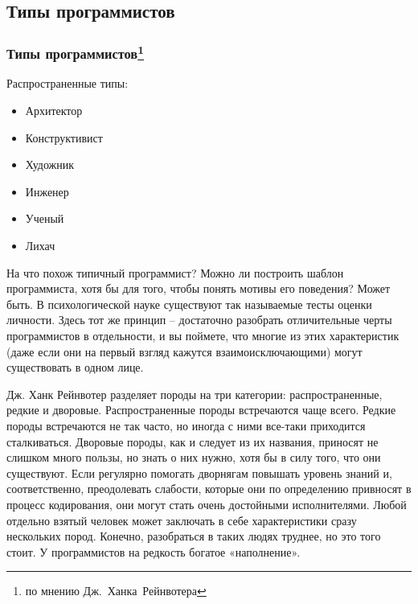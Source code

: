 \documentclass{../industrial-development}
\begin{document}
{\subsection{Типы программистов}
\begin{frame} \frametitle{Типы программистов\footnote[1]{по мнению Дж.~Ханка~Рейнвотера}}
	\begin{block}{Распространенные типы:}
\begin{itemize}
\item Архитектор
\item Конструктивист 
\item Художник
\item Инженер
\item Ученый
\item Лихач
\end{itemize}
\end{block}
\end{frame}
\lecturenotes
На что похож типичный программист? Можно ли построить шаблон программиста, хотя бы для того, чтобы понять мотивы его поведения? Может быть. В психологической науке существуют так называемые тесты оценки личности. Здесь тот же принцип – достаточно разобрать отличительные черты программистов в отдельности, и вы поймете, что многие из этих характеристик (даже если они на первый взгляд кажутся взаимоисключающими) могут существовать в одном лице. 

Дж. Ханк Рейнвотер разделяет породы на три категории: распространенные, редкие и дворовые. Распространенные породы встречаются чаще всего. 
Редкие породы встречаются не так часто, но иногда с ними все-таки приходится сталкиваться. Дворовые породы, как и следует из их названия, приносят не слишком много пользы, но знать о них нужно, хотя бы в силу того, что они существуют. Если регулярно помогать дворнягам повышать уровень знаний и, соответственно, преодолевать слабости, которые они по определению привносят в процесс кодирования, они могут стать очень достойными исполнителями.
Любой отдельно взятый человек может заключать в себе характеристики сразу нескольких пород. Конечно, разобраться в таких людях труднее, но это того стоит. У программистов на редкость богатое «наполнение». 


}
\end{document}
